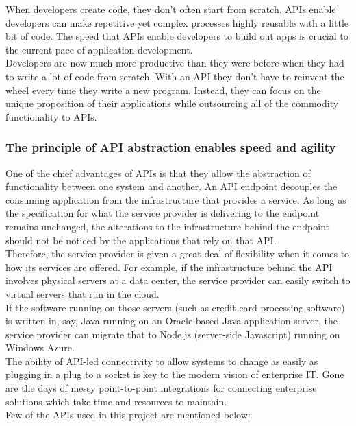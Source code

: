 \documentclass[14pt]{report}
\begin{document}
			When developers create code, they don’t often start from scratch. APIs enable developers can make repetitive yet complex processes highly reusable with a little bit of code. The speed that APIs enable developers to build out apps is crucial to the current pace of application development.\\

			Developers are now much more productive than they were before when they had to write a lot of code from scratch. With an API they don’t have to reinvent the wheel every time they write a new program. Instead, they can focus on the unique proposition of their applications while outsourcing all of the commodity functionality to APIs.
			\subsubsection{The principle of API abstraction enables speed and agility}
			One of the chief advantages of APIs is that they allow the abstraction of functionality between one system and another. An API endpoint decouples the consuming application from the infrastructure that provides a service. As long as the specification for what the service provider is delivering to the endpoint remains unchanged, the alterations to the infrastructure behind the endpoint should not be noticed by the applications that rely on that API.\\

			Therefore, the service provider is given a great deal of flexibility when it comes to how its services are offered. For example, if the infrastructure behind the API involves physical servers at a data center, the service provider can easily switch to virtual servers that run in the cloud.\\
			
			If the software running on those servers (such as credit card processing software) is written in, say, Java running on an Oracle-based Java application server, the service provider can migrate that to Node.js (server-side Javascript) running on Windows Azure.\\
			
			The ability of API-led connectivity to allow systems to change as easily as plugging in a plug to a socket is key to the modern vision of enterprise IT. Gone are the days of messy point-to-point integrations for connecting enterprise solutions which take time and resources to maintain.\\

			Few of the APIs used in this project are mentioned below:
\end{document}
